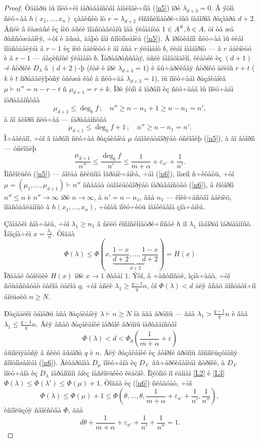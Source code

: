 \documentclass{article}
\numberwithin{equation}{section}
\theoremstyle{plain}
\theoremstyle{definition}
\newtheorem{proof}{Äîêàçàòåëüñòâî}
\begin{document}
\begin{fulltext}
\begin{proof}
Òåïåðü ìû ïîëó÷èì íåðàâåíñòâî àíàëîãè÷íîå (\ref{n5}) ïðè $\lambda_{d+3}=0$. Â ýòîì ñëó÷àå
$h(x_1,\ldots, x_n)$ çàâèñèò îò $r=\lambda_{d+2}$ êîñîñèììåòðè÷íûõ íàáîðîâ ðàçìåðà
$d+2$. Åñëè â êàæäûé èç íèõ áûëè ïîäñòàâëåíû îáà ýëåìåíòà $1\in A^\#, b\in A$, òî òå
æå ðàññóæäåíèÿ, ÷òî è âûøå, äàþò íàì ñîîòíîøåíèå (\ref{n5}). Â ïðîòèâíîì ñëó÷àå ìû ëèáî ïîäñòàâëÿåì â $r-1$ èç íèõ åäèíèöó è âî âñå $r$ ýëåìåíò $b$, ëèáî íàîáîðîò ---
â $r$ åäèíèöó è â $r-1$ --- áàçèñíûé ýëåìåíò $b$. Ïåðåáðàñûâàÿ, åñëè íåîáõîäèìî, êëåòêè
èç $(d+1)$-é ñòðîêè $D_\lambda$ â $(d+2)$-þ (êàê è ïðè $\lambda_{d+3}=1$) è âû÷åðêèâàÿ ñòðîêó
äëèíû $r+t$ ($k$ è $t$ îïðåäåëÿþòñÿ òàêæå êàê â ñëó÷àå $\lambda_{d+3}=1$), ìû ïîëó÷àåì ðàçáèåíèå
$\mu\vdash n''=n-r-t$ ñ $\mu_{d+1}=r+k$. Ïðè ýòîì â ïåðâîì èç ñëó÷àåâ ìû ïîëó÷àåì
íåðàâåíñòâà
$$
\mu_{d+1}\le\deg_b f\,;\quad n''\ge n-n_1+1\ge n-n_1=n',
$$
à âî âòîðîì ñëó÷àå --- íåðàâåíñòâà
$$
\mu_{d+1}\le\deg_b f+1\,;\quad n''\ge n-n_1=n'.
$$
Î÷åâèäíî, ÷òî â ïåðâîì ñëó÷àå ðàçáèåíèå $\mu$ óäîâëåòâîðÿåò óñëîâèþ (\ref{n5}), à âî
âòîðîì --- óñëîâèþ
\begin{equation}\label{n6}
\frac{\mu_{d+1}}{n''} \le \frac{\deg_b f}{n'} \le \frac{1}{m+\alpha}+\varepsilon_{n'}
+\frac{1}{n'}.
\end{equation}
Ïîñêîëüêó (\ref{n5}) --- áîëåå ñèëüíîå îãðàíè÷åíèå, ÷åì (\ref{n6}), ìîæíî ñ÷èòàòü, ÷òî
$\mu=(\mu_1,\ldots,\mu_{d+1})\vdash n''$ âñåãäà óäîâëåòâîðÿåò íåðàâåíñòâó (\ref{n6}), â
êîòîðîì $n''\le n$ è $n''\to\infty$ ïðè $n\to\infty$, à $n'=n-n_1$, ãäå $n_1$ --- 
êîëè÷åñòâî åäèíèö, ïîäñòàâëåííûõ â $h(x_1,\ldots,x_n)$, ÷òîáû ïîëó÷èòü íåíóëåâîå çíà÷åíèå.

Çàìåòèì ñíà÷àëà, ÷òî $\lambda_1 \ge n_1$ â ñèëó êîñîñèììåòðè÷íîñòè $h$ ïî $\lambda_1$
íàáîðàì ïåðåìåííûõ. Îáîçíà÷èì $x=\frac{\lambda_1}{n}$. Òîãäà
$$
\Phi(\lambda) \le 
\Phi\left(x,\underbrace{\frac{1-x}{d+2},\ldots,\frac{1-x}{d+2} }_{d+2}\right)=H(x)
$$
Ïðåäåë ôóíêöèè $H(x)$ ïðè $x\to 1$ ðàâåí $1$. Ýòî, â ÷àñòíîñòè, îçíà÷àåò, ÷òî
ñóùåñòâóåò òàêîå öåëîå $q$, ÷òî åñëè $\lambda_1\ge\frac{q-1}{q}n$, òî $\Phi(\lambda) <d$ äëÿ âñåõ äîñòàòî÷íî áîëüøèõ $n\ge N$.

Ðàçäåëèì òåïåðü âñå ðàçáèåíèÿ $\lambda\vdash n\ge N$ íà äâå ãðóïïû --- ãäå 
$\lambda_1 >\frac{q-1}{q}n$ è ãäå $\lambda_1 \le\frac{q-1}{q}n$. Äëÿ âñåõ ðàçáèåíèé
ïåðâîé ãðóïïû íåðàâåíñòâî
$$
\Phi(\lambda) < d < \Phi_d(\frac{1}{m+\alpha}+\varepsilon)
$$
âûïîëíÿåòñÿ â ñèëó âûáîðà $q$ è $n$. Äëÿ ðàçáèåíèé èç âòîðîé ãðóïïû âîñïîëüçóåìñÿ ñîîòíîøåíèåì
(\ref{n6}). Äèàãðàììà $D_\mu$ ïîëó÷åíà èç $D_{\lambda'}$ âû÷åðêèâàíèåì ñòðîêè, à $D_{\lambda'}$ ïîëó÷åíà èç $D_{\lambda}$ ïåðåíîñîì âíèç
íåñêîëüêèõ êëåòîê. Ïîýòîìó ïî ëåììàì \ref{L2} è \ref{L3}
$\Phi(\lambda) \le \Phi(\lambda') \le \Phi(\mu)+1$. Òîãäà èç (\ref{n6}) ñëåäóåò, ÷òî
$$
\Phi(\lambda) \le  \Phi(\mu)+1 \le 
\Phi(\theta,\ldots,\theta,\frac{1}{m+\alpha}+\varepsilon_{n'}+\frac{1}{n'},\frac{1}{n''}),
$$
èñïîëüçóÿ ñâîéñòâà $\Phi$, ãäå
$$
d\theta+\frac{1}{m+\alpha}+\varepsilon_{n'}+\frac{1}{n'}+\frac{1}{n''}=1.
$$


\end{proof}
\end{fulltext}
\end{document}
